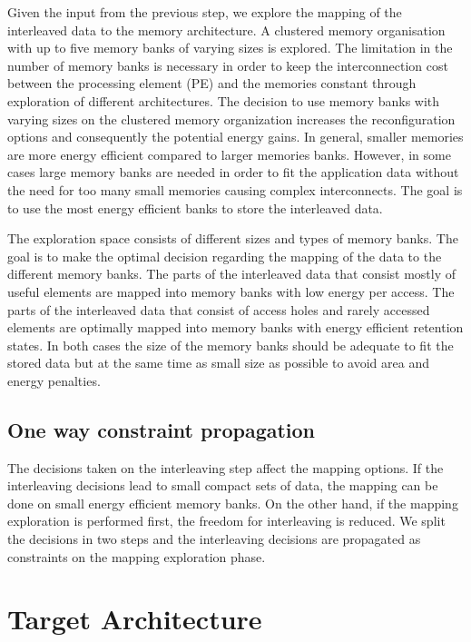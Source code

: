 \documentclass[prodmode,acmtodaes]{acmsmall}
\begin{document}
Given the input from the previous step, we explore the mapping of the interleaved data to the memory architecture.
A clustered memory organisation with up to five memory banks of varying sizes is explored. 
The limitation in the number of memory banks is necessary in order to keep the interconnection cost between the processing element (PE) and the memories constant through exploration of different architectures. 
The decision to use memory banks with varying sizes on the clustered memory organization increases the reconfiguration options and consequently the potential energy gains. 
In general, smaller memories are more energy efficient compared to larger memories banks. 
However, in some cases large memory banks are needed in order to fit the application data without the need for too many small memories causing complex interconnects. 
The goal is to use the most energy efficient banks to store the interleaved data.

The exploration space consists of different sizes and types of memory banks.
The goal is to make the optimal decision regarding the mapping of the data to the different memory banks.
The parts of the interleaved data that consist mostly of useful elements are mapped into memory banks with low energy per access.
The parts of the interleaved data that consist of access holes and rarely accessed elements are optimally mapped into memory banks with energy efficient retention states.
In both cases the size of  the memory banks should be adequate to fit the stored data but at the same time as small size as possible to avoid area and energy penalties.

\subsection{One way constraint propagation}

The decisions taken on the interleaving step affect the mapping options.
If the interleaving decisions lead to small compact sets of data, the mapping can be done on small energy efficient memory banks.
On the other hand, if the mapping exploration is performed first, the freedom for interleaving is reduced.
We split the decisions in two steps and the interleaving decisions are propagated as constraints on the mapping exploration phase. 

\section{Target Architecture}
\label{sec:platform}
\end{document}
